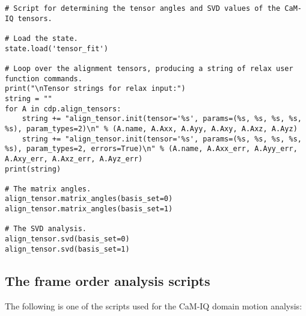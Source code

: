 \begin{lstlisting}
# Script for determining the tensor angles and SVD values of the CaM-IQ tensors.

# Load the state.
state.load('tensor_fit')

# Loop over the alignment tensors, producing a string of relax user function commands.
print("\nTensor strings for relax input:")
string = ""
for A in cdp.align_tensors:
    string += "align_tensor.init(tensor='%s', params=(%s, %s, %s, %s, %s), param_types=2)\n" % (A.name, A.Axx, A.Ayy, A.Axy, A.Axz, A.Ayz)
    string += "align_tensor.init(tensor='%s', params=(%s, %s, %s, %s, %s), param_types=2, errors=True)\n" % (A.name, A.Axx_err, A.Ayy_err, A.Axy_err, A.Axz_err, A.Ayz_err)
print(string)

# The matrix angles.
align_tensor.matrix_angles(basis_set=0)
align_tensor.matrix_angles(basis_set=1)

# The SVD analysis.
align_tensor.svd(basis_set=0)
align_tensor.svd(basis_set=1)
\end{lstlisting}


\subsection{The frame order analysis scripts}
\label{sect: frame order analysis script}

The following is one of the scripts used for the CaM-IQ domain motion analysis:

